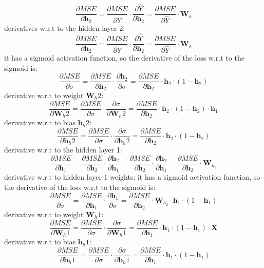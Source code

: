 \documentclass{article}
\begin{document}
\[
\frac{\partial MSE}{\partial \mathbf{h}_2} = \frac{\partial MSE}{\partial \hat{Y}} \cdot \frac{\partial \hat{Y}}{\partial \mathbf{h}_2} = \frac{\partial MSE}{\partial \hat{Y}} \cdot \mathbf{W}_o
\]
derivatives w.r.t to the hidden layer 2:
\[
\frac{\partial MSE}{\partial \mathbf{h}_2} = \frac{\partial MSE}{\partial \hat{Y}} \cdot \frac{\partial \hat{Y}}{\partial \mathbf{h}_2} = \frac{\partial MSE}{\partial \hat{Y}} \cdot \mathbf{W}_o
\]
it has a sigmoid activation function, so the derivative of the loss w.r.t to the sigmoid is:
\[
\frac{\partial MSE}{\partial \sigma} = \frac{\partial MSE}{\partial \mathbf{h}_2} \cdot \frac{\partial \mathbf{h}_2}{\partial \sigma} = \frac{\partial MSE}{\partial \mathbf{h}_2} \cdot \mathbf{h}_2 \cdot (1 - \mathbf{h}_2)
\]
derivative w.r.t to weight $\mathbf{W}_h2$:
\[
\frac{\partial MSE}{\partial \mathbf{W}_h2} = \frac{\partial MSE}{\partial \sigma} \cdot \frac{\partial \sigma}{\partial \mathbf{W}_h2} = \frac{\partial MSE}{\partial \mathbf{h}_2} \cdot \mathbf{h}_2 \cdot (1 - \mathbf{h}_2) \cdot \mathbf{h}_1
\]
derivative w.r.t to bias $\mathbf{b}_h2$:
\[
\frac{\partial MSE}{\partial \mathbf{b}_h2} = \frac{\partial MSE}{\partial \sigma} \cdot \frac{\partial \sigma}{\partial \mathbf{b}_h2} = \frac{\partial MSE}{\partial \mathbf{h}_2} \cdot \mathbf{h}_2 \cdot (1 - \mathbf{h}_2)
\]
derivative w.r.t to the hidden layer 1:
\[
\frac{\partial MSE}{\partial \mathbf{h}_1} = \frac{\partial MSE}{\partial \mathbf{h}_2} \cdot \frac{\partial \mathbf{h}_2}{\partial \mathbf{h}_1} = \frac{\partial MSE}{\partial \mathbf{h}_2} \cdot \frac{\partial \mathbf{h}_2}{\partial \mathbf{h}_1} = \frac{\partial MSE}{\partial \mathbf{h}_2} \cdot \mathbf{W}_{h_2}
\]
derivative w.r.t to hidden layer 1 weights:
it has a sigmoid activation function, so the derivative of the loss w.r.t to the sigmoid is:
\[
\frac{\partial MSE}{\partial \sigma} = \frac{\partial MSE}{\partial \mathbf{h}_1} \cdot \frac{\partial \mathbf{h}_1}{\partial \sigma} = \frac{\partial MSE}{\partial \mathbf{h}_2} \cdot \mathbf{W}_{h_2} \cdot \mathbf{h}_1 \cdot (1 - \mathbf{h}_1) 
\]
derivative w.r.t to weight $\mathbf{W}_h1$:
\[
\frac{\partial MSE}{\partial \mathbf{W}_h1} = \frac{\partial MSE}{\partial \sigma} \cdot \frac{\partial \sigma}{\partial \mathbf{W}_h1} = \frac{\partial MSE}{\partial \mathbf{h}_1} \cdot \mathbf{h}_1 \cdot (1 - \mathbf{h}_1) \cdot \mathbf{X}
\]
derivative w.r.t to bias $\mathbf{b}_h1$:
\[
\frac{\partial MSE}{\partial \mathbf{b}_h1} = \frac{\partial MSE}{\partial \sigma} \cdot \frac{\partial \sigma}{\partial \mathbf{b}_h1} = \frac{\partial MSE}{\partial \mathbf{h}_1} \cdot \mathbf{h}_1 \cdot (1 - \mathbf{h}_1)
\]
\end{document}
